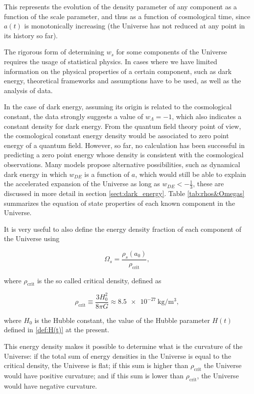\documentclass[openany,a4paper,12pt,oneside]{book}
\begin{document}
\begin{spacing}{1.5}
\noindent This represents the evolution of the density parameter of any component as a function of the scale parameter, and thus as a function of cosmological time, since $a(t)$ is monotonically increasing (the Universe has not reduced at any point in its history so far).

The rigorous form of determining $w_s$ for some components of the Universe requires the usage of statistical physics. In cases where we have limited information on the physical properties of a certain component, such as dark energy, theoretical frameworks and assumptions have to be used, as well as the analysis of data.

In the case of dark energy, assuming its origin is related to the cosmological constant, the data strongly suggests a value of $w_\Lambda=-1$, which also indicates a constant density for dark energy. From the quantum field theory point of view, the cosmological constant energy density would be associated to zero point energy of a quantum field. However, so far, no calculation has been successful in predicting a zero point energy whose density is consistent with the cosmological observations\cite{Weinberg_Lambda_1989}. Many models propose alternative possibilities, such as dynamical dark energy in which $w_{DE}$ is a function of $a$\cite{DE_models}, which would still be able to explain the accelerated expansion of the Universe as long as $w_{DE}<-\frac{1}{3}$, these are discussed in more detail in section \ref{sect:dark_energy}. Table \ref{tab:rhos&Omegas} summarizes the equation of state properties of each known component in the Universe.

It is very useful to also define the energy density fraction of each component of the Universe using

\begin{equation}\label{eq:Omega_def}
    \Omega_s=\frac{\rho_s(a_0)}{\rho_\text{crit}},
\end{equation}

\noindent where $\rho_\text{crit}$ is the so called critical density, defined as

\begin{equation}\label{def:rho_crit}
    \rho_\text{crit}\equiv \frac{3H_0^2}{8\pi G}\approx \SI{8.5e-27}{\kilogram /\meter^{3}},
\end{equation}

\noindent where $H_0$ is the Hubble constant, the value of the Hubble parameter $H(t)$ defined in \eqref{def:H(t)} at the present.

This energy density makes it possible to determine what is the curvature of the Universe: if the total sum of energy densities in the Universe is equal to the critical density, the Universe is flat; if this sum is higher than $\rho_\text{crit}$ the Universe would have positive curvature; and if this sum is lower than $\rho_\text{crit}$, the Universe would have negative curvature\cite{schutz2009first}. 


\end{spacing}
\end{document}
